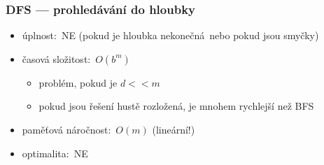 \documentclass[red,professionalfont]{beamer}
\theoremstyle{definition}
\newcommand{\0}{\mbox{${\bf 0}$}}
\begin{document}
\begin{frame}
\begin{tikzpicture}[grow=right]
\end{tikzpicture}

\end{frame}

\begin{frame}\frametitle{DFS --- prohledávání do hloubky}
\begin{itemize}
  \item úplnost:\pause\ NE (pokud je hloubka nekonečná\pause\ nebo pokud jsou smyčky)\pause
  \item časová složitost:\pause\ $O(b^m)$\pause
  \begin{itemize}
  \item problém, pokud je $d<<m$
  \item pokud jsou řešení hustě rozložená, je mnohem rychlejší než BFS
  \end{itemize}
  \item paměťová náročnost:\pause\ $O(m)$ (\alert{lineární}!)\pause
  \item optimalita:\pause\ NE
 \end{itemize}\pause
\end{frame}
\end{document}
